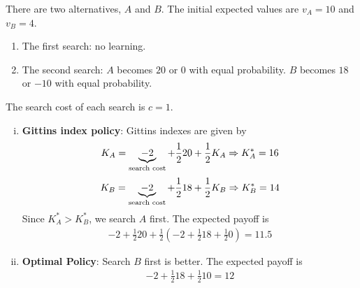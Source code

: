 \documentclass[11pt]{elegantbook}
\begin{document}
\begin{example}
    There are two alternatives, $A$ and $B$. The initial expected values are $v_A=10$ and $v_B=4$.
    \begin{enumerate}
        \item The first search: no learning.
        \item The second search: $A$ becomes $20$ or $0$ with equal probability. $B$ becomes $18$ or $-10$ with equal probability.
    \end{enumerate}
    The search cost of each search is $c=1$.
    \begin{enumerate}[(i).]
        \item \textbf{Gittins index policy}: Gittins indexes are given by
        \begin{equation}
            \begin{aligned}
                K_A=\underbrace{-2}_\textnormal{search cost}+\frac{1}{2}20+\frac{1}{2}K_A \Rightarrow K_A^*=16
            \end{aligned}
            \nonumber
        \end{equation}
        \begin{equation}
            \begin{aligned}
                K_B=\underbrace{-2}_\textnormal{search cost}+\frac{1}{2}18+\frac{1}{2}K_B \Rightarrow K_B^*=14
            \end{aligned}
            \nonumber
        \end{equation}
        Since $K_A^*>K_B^*$, we search $A$ first. The expected payoff is
        \begin{equation}
            \begin{aligned}
                -2+\frac{1}{2}20+\frac{1}{2}\left(-2+\frac{1}{2}18+\frac{1}{2}0\right)=11.5
            \end{aligned}
            \nonumber
        \end{equation}
        \item \textbf{Optimal Policy}: Search $B$ first is better. The expected payoff is
        \begin{equation}
            \begin{aligned}
                -2+\frac{1}{2}18+\frac{1}{2}10=12
            \end{aligned}
            \nonumber
        \end{equation}
    \end{enumerate}
\end{example}
\end{document}
